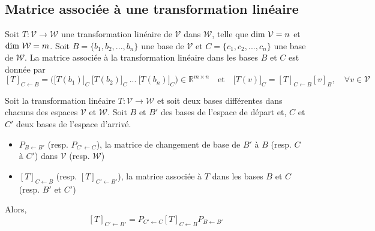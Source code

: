 	\subsection{Matrice associée à une transformation linéaire}
		\begin{mydef}
			Soit $T : \mathcal{V}\longrightarrow\mathcal{W}$ une transformation linéaire de $\mathcal{V}$ dans $\mathcal{W}$, telle que $\text{\normalfont{dim}}\ \mathcal{V}=n$ et $\text{\normalfont{dim}}\ \mathcal{W}=m$. Soit $B=\{b_1,b_2,...,b_n\}$ une base de $\mathcal{V}$ et $C=\{c_1,c_2,...,c_n\}$ une base de $\mathcal{W}$. La matrice associée à la transformation linéaire dans les bases $B$ et $C$ est donnée par
			\[[T]_{C\leftarrow B}=\Big(\big[T(b_1)\big]_C\: \big[T(b_2)\big]_C\: ...\: \big[T(b_n)\big]_C\Big)\in\mathbb{R}^{m\times n}\quad\text{et}\quad\big[T(v)\big]_C = [T]_{C\leftarrow B}[v]_B,\quad\forall v\in\mathcal{V}\]
		\end{mydef}
		\begin{myprop}
			Soit la transformation linéaire $T : \mathcal{V}\longrightarrow\mathcal{W}$ et soit deux bases différentes dans chacuns des espaces $\mathcal{V}$ et $\mathcal{W}$. Soit $B$ et $B'$ des bases de l'espace de départ et, $C$ et $C'$ deux bases de l'espace d'arrivé.
			\begin{itemize}
				\item $P_{B\leftarrow B'}$ (resp. $P_{C'\leftarrow C}$), la matrice de changement de base de $B'$ à $B$ (resp. $C$ à $C'$) dans $\mathcal{V}$ (resp. $\mathcal{W}$)
				\item $[T]_{C\leftarrow B}$ (resp. $[T]_{C'\leftarrow B'}$), la matrice associée à $T$ dans les bases $B$ et $C$ (resp. $B'$ et $C'$) 
			\end{itemize}
		Alors, \[[T]_{C'\leftarrow B'}=P_{C'\leftarrow C}[T]_{C\leftarrow B}P_{B\leftarrow B'}\]
		\end{myprop}
